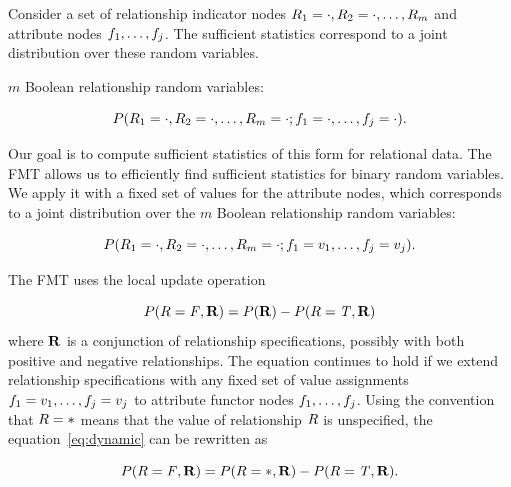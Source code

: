 \documentclass{article}
\begin{document}
Consider a set of relationship indicator nodes $R_{1} = \cdot, R_{2} = \cdot,\ldots, R_{m}$ and attribute nodes $f_{1},\ldots,f_{j}$. The sufficient statistics correspond to a joint distribution over these random variables.

$m$ Boolean relationship random variables:

$$P(R_{1} = \cdot, R_{2} = \cdot,\ldots, R_{m} = \cdot; f_{1} = \cdot,\ldots,f_{j} = \cdot).$$

Our goal is to compute sufficient statistics of this form for relational data. The FMT allows us to efficiently find sufficient statistics for binary random variables. We apply it with a fixed set of values for the attribute nodes, which corresponds to a joint distribution over the $m$ Boolean relationship random variables:

$$P(R_{1} = \cdot, R_{2} = \cdot,\ldots, R_{m} = \cdot; f_{1} = v_{1},\ldots,f_{j} = v_{j}).$$

The FMT uses the local update operation

\begin{equation}
P(R = \mathit{F}, \mathbf{R}) =
P(\mathbf{R}) - P(R = \mathit{T}, \mathbf{R})
\label{eq:dynamic}
\end{equation}
where $\mathbf{R}$ is a conjunction of relationship specifications, possibly with both positive and negative relationships. The equation continues to hold if we extend relationship specifications with  any fixed set of value assignments $f_{1} = v_{1},\ldots,f_{j} = v_{j}$ to attribute functor nodes $f_{1},\ldots,f_{j}$. Using the convention that $R = \ast$ means that the value of relationship $R$ is unspecified, the equation~\eqref{eq:dynamic} can be rewritten as

\begin{equation}
P(R = \mathit{F}, \mathbf{R}) =
P(R=*, \mathbf{R}) - P(R = \mathit{T}, \mathbf{R}).
\label{eq:dynamic2}
\end{equation}
\end{document}
